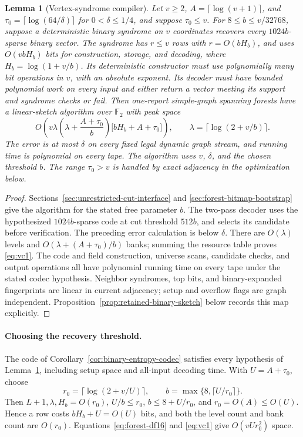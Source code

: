 \documentclass[11pt,letterpaper]{article}
\newtheorem{lemma}[theorem]{Lemma}
\numberwithin{equation}{section}
\begin{document}
\begin{lemma}[Vertex-syndrome compiler]
\label{lem:compiler}
Let $v\ge2$, $A=\lceil\log(v+1)\rceil$, and $\tau_0=\lceil\log(64/\delta)\rceil$ for $0<\delta\le1/4$, and suppose $\tau_0\le v$.
For $8\le b\le v/32768$, suppose a deterministic binary syndrome on $v$ coordinates recovers every $1024b$-sparse binary vector.
The syndrome has $r\le v$ rows with $r=O(bH_b)$, and uses $O(vbH_b)$ bits for construction, storage, and decoding, where $H_b=\log(1+v/b)$.
Its deterministic constructor must use polynomially many bit operations in $v$, with an absolute exponent.
Its decoder must have bounded polynomial work on \emph{every} input and either return a vector meeting its support and syndrome checks or fail.
Then one-report simple-graph spanning forests have a linear-sketch algorithm over $\mathbb F_2$ with peak space
\begin{equation}
O\!\left(v\lambda\left(\lambda+\frac{A+\tau_0}{b}\right)
                    \bigl[bH_b+A+\tau_0\bigr]\right),\qquad
 \lambda=\lceil\log(2+v/b)\rceil. \label{eq:vc1}
\end{equation}
The error is at most $\delta$ on every fixed legal dynamic graph stream, and running time is polynomial on every tape.
The algorithm uses $v$, $\delta$, and the chosen threshold $b$.
The range $\tau_0>v$ is handled by exact adjacency in the optimization below.
\end{lemma}
\begin{proof}
Sections~\ref{sec:unrestricted-cut-interface} and \ref{sec:forest-bitmap-bootstrap} give the algorithm for the stated free parameter $b$.
The two-pass decoder uses the hypothesized $1024b$-sparse code at cut threshold $512b$, and selects its candidate before verification.
The preceding error calculation is below $\delta$.
There are $O(\lambda)$ levels and $O(\lambda+(A+\tau_0)/b)$ banks; summing the resource table proves \eqref{eq:vc1}.
The code and field construction, universe scans, candidate checks, and output operations all have polynomial running time on every tape under the stated codec hypothesis.
Neighbor syndromes, top bits, and binary-expanded fingerprints are linear in current adjacency; setup and overflow flags are graph independent.
Proposition~\ref{prop:retained-binary-sketch} below records this map explicitly.
\end{proof}

\paragraph{Choosing the recovery threshold.}
The code of Corollary~\ref{cor:binary-entropy-codec} satisfies every hypothesis of Lemma~\ref{lem:compiler}, including setup space and all-input decoding time.
With $U=A+\tau_0$, choose
\begin{equation}
r_0=\lceil\log(2+v/U)\rceil,\qquad
 b=\max\{8,\lceil U/r_0\rceil\}. \label{eq:forest-df12}
\end{equation}
Then $L+1,\lambda,H_b=O(r_0)$, $U/b\le r_0$, $b\le8+U/r_0$, and $r_0=O(A)\le O(U)$.
Hence a row costs $bH_b+U=O(U)$ bits, and both the level count and bank count are $O(r_0)$.
Equations~\eqref{eq:forest-df16} and \eqref{eq:vc1} give $O(vUr_0^2)$ space.
\end{document}
